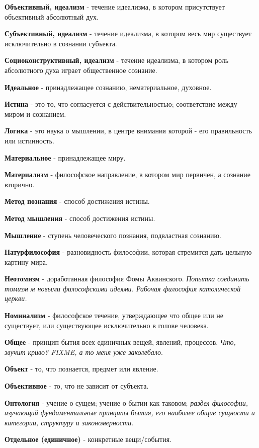 \textbf{Объективный, идеализм} - течение идеализма, в котором присутствует объективный абсолютный дух.

\textbf{Субъективный, идеализм} - течение идеализма, в котором весь мир существует исключительно в сознании субъекта.

\textbf{Социоконструктивный, идеализм} - течение идеализма, в котором роль абсолютного духа играет общественное сознание.

\textbf{Идеальное} - принадлежащее сознанию, нематериальное, духовное.

\textbf{Истина} - это то, что согласуется с действительностью; соответствие между миром и сознанием.

\textbf{Логика} - это наука о мышлении, в центре внимания которой - его правильность или истинность.

\textbf{Материальное} - принадлежащее миру.

\textbf{Материализм} - философское направление, в котором мир первичен, а сознание вторично.

\textbf{Метод познания} - способ достижения истины.

\textbf{Метод мышления} - способ достижения истины.

\textbf{Мышление} - ступень человеческого познания, подвластная сознанию.

\textbf{Натурфилософия} - разновидность философии, которая стремится дать цельную картину мира. 

\textbf{Неотомизм} - доработанная философия Фомы Аквинского. \textit{Попытка соединить томизм м новыми философскими идеями. Рабочая философия католической церкви.}

\textbf{Номинализм} - философское течение, утверждающее что общее или не существует, или существующее исключительно в голове человека.

\textbf{Общее} - принцип бытия всех единичных вещей, явлений, процессов. \textit{Что, звучит криво? FIXME, а то меня уже заколебало}.

\textbf{Объект} - то, что познается, предмет или явление.

\textbf{Объективное} - то, что не зависит от субъекта.

\textbf{Онтология} - учение о сущем; учение о бытии как таковом; \textit{раздел философии, изучающий фундаментальные принципы бытия, его наиболее общие сущности и категории, структуру и закономерности}.

\textbf{Отдельное (единичное)} - конкретные вещи/события.

